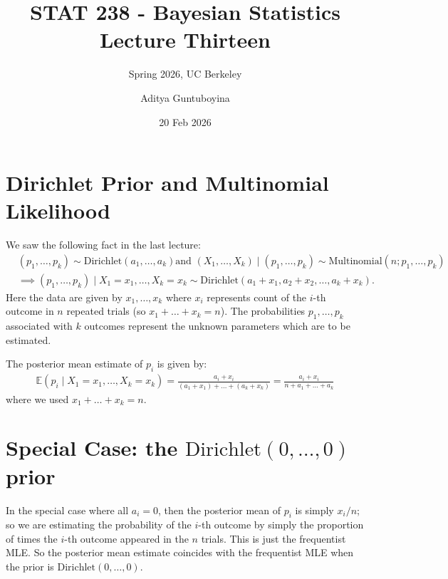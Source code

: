 \documentclass{scrartcl}
\newcommand{\E}{{\mathbb E}}
\begin{document}
\title{STAT 238 - Bayesian Statistics  \\
  Lecture Thirteen} 
\subtitle{Spring 2026, UC Berkeley}

\author{Aditya Guntuboyina}


\date{20 Feb 2026}

\maketitle


\section{Dirichlet Prior and Multinomial Likelihood}

We saw the following fact in the last lecture: 
\begin{align*}
&  (p_1, \dots, p_k) \sim \text{Dirichlet}(a_1, \dots, a_k)  \text{
  and }  (X_1, \dots, X_k) \mid (p_1, \dots, p_k) \sim 
  \text{Multinomial}(n; p_1, \dots, p_k) \\
& \implies (p_1, \dots, p_k) \mid X_1 = x_1, \dots, X_k = x_k \sim
  \text{Dirichlet}(a_1 + x_1, a_2 + x_2, \dots, a_k + x_k). 
\end{align*}
Here the data are given by $x_1, \dots, x_k$ where $x_i$ represents
count of the $i$-th outcome in $n$ repeated trials (so $x_1 + \dots + x_k =
n$). The probabilities $p_1, \dots, p_k$ associated with $k$
outcomes represent the unknown parameters which are to
be estimated. 

The posterior mean estimate of $p_i$ is given by:
\begin{align*}
  \E (p_i \mid X_1 = x_1, \dots, X_k = x_k) = \frac{a_i + x_i}{(a_1 +
  x_1) + \dots + (a_k + x_k)} = \frac{a_i + x_i}{n + a_1 + \dots +
  a_k}
\end{align*}
where we used $x_1 + \dots + x_k = n$.

\section{Special Case: the $\text{Dirichlet}(0, \dots, 0)$ prior}

In the special case where all $a_i = 0$, then the posterior mean of
$p_i$ is simply $x_i/n$; so we are estimating the probability of the
$i$-th outcome by simply the proportion of times the $i$-th outcome
appeared in the $n$ trials. This is just the frequentist MLE. So the
posterior mean estimate coincides with the frequentist MLE when the
prior is $\text{Dirichlet}(0, \dots, 0)$.
\end{document}
